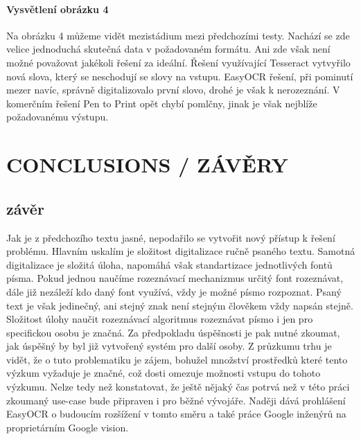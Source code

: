\documentclass[journal]{IEEEtran}
\begin{document}
\paragraph{Vysvětlení obrázku 4}
Na obrázku 4 můžeme vidět mezistádium mezi předchozími testy.
Nachází se zde velice jednoduchá skutečná data v požadovaném formátu.
Ani zde však není možné považovat jakékoli řešení za ideální.
Řešení využívající Tesseract vytvyřilo nová slova, který se neschodují se slovy na vstupu.
EasyOCR řešení, při pominutí mezer navíc, správně digitalizovalo první slovo,  drohé je však k nerozeznání.
V komerčním řešení Pen to Print opět chybí pomlčny, jinak je však nejblíže požadovanému výstupu.


\section{CONCLUSIONS / ZÁVĚRY}
\subsection{závěr}
Jak je z předchozího textu jasné, nepodařilo se vytvořit nový přístup k řešení problému.
Hlavním uskalím je složitost digitalizace ručně psaného textu.
Samotná digitalizace je složitá úloha, napomáhá však standartizace jednotlivých fontů písma.
Pokud jednou naučíme rozeznávací mechanizmus určitý font rozeznávat, dále již nezáleží kdo daný font využívá, vždy je možné písmo rozpoznat.
Psaný text je však jedinečný, ani stejný znak není stejným člověkem vždy napsán stejně.
Složitost úlohy naučit rozeznávací algoritmus rozeznávat písmo i jen pro specifickou osobu je značná.
Za předpokladu úspěšnosti je pak nutné zkoumat, jak úspěšný by byl již vytvořený systém pro další osoby.
Z průzkumu trhu je vidět, že o tuto problematiku je zájem, bohužel množství prostředků které tento výzkum vyžaduje je značné, což dosti omezuje možnosti vstupu do tohoto výzkumu.
Nelze tedy než konstatovat, že ještě nějaký čas potrvá než v této práci zkoumaný use-case bude připraven i pro běžné vývojáře.
Naději dává prohlášení EasyOCR o budoucím rozšížení v tomto směru a také práce Google inženýrů na proprietárním Google vision.



\printbibliography

\printacronyms


\end{document}
